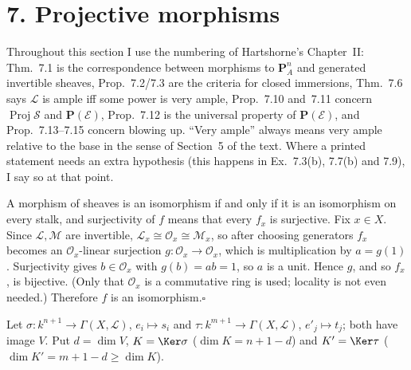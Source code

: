 \documentclass[11pt]{article}
\begin{document}
\section*{7. Projective morphisms}

Throughout this section I use the numbering of Hartshorne's Chapter~II: Thm.~7.1 is the correspondence between morphisms to $\mathbf P^n_A$ and generated invertible sheaves, Prop.~7.2/7.3 are the criteria for closed immersions, Thm.~7.6 says $\mathcal L$ is ample iff some power is very ample, Prop.~7.10 and~7.11 concern $\operatorname{Proj}\mathcal S$ and $\mathbf P(\mathcal E)$, Prop.~7.12 is the universal property of $\mathbf P(\mathcal E)$, and Prop.~7.13--7.15 concern blowing up. ``Very ample'' always means very ample relative to the base in the sense of Section~5 of the text. Where a printed statement needs an extra hypothesis (this happens in Ex.~7.3(b), 7.7(b) and 7.9), I say so at that point.

\pf
A morphism of sheaves is an isomorphism if and only if it is an isomorphism on every stalk, and surjectivity of $f$ means that every $f_x$ is surjective. Fix $x\in X$. Since $\mathcal L,\mathcal M$ are invertible, $\mathcal L_x\cong\mathcal O_x\cong\mathcal M_x$, so after choosing generators $f_x$ becomes an $\mathcal O_x$-linear surjection $g:\mathcal O_x\to\mathcal O_x$, which is multiplication by $a=g(1)$. Surjectivity gives $b\in\mathcal O_x$ with $g(b)=ab=1$, so $a$ is a unit. Hence $g$, and so $f_x$, is bijective. (Only that $\mathcal O_x$ is a commutative ring is used; locality is not even needed.) Therefore $f$ is an isomorphism.\hfill$\square$

\pf
Let $\sigma:k^{n+1}\to\Gamma(X,\mathcal L)$, $e_i\mapsto s_i$ and $\tau:k^{m+1}\to\Gamma(X,\mathcal L)$, $e'_j\mapsto t_j$; both have image $V$. Put $d=\dim V$, $K=\Ker\sigma$ ($\dim K=n+1-d$) and $K'=\Ker\tau$ ($\dim K'=m+1-d\ge\dim K$).
\end{document}
